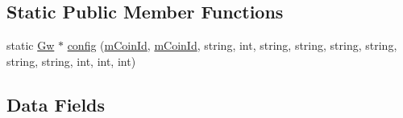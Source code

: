 \subsection*{Static Public Member Functions}
\begin{DoxyCompactItemize}
\item 
static \hyperlink{class_k_1_1_gw}{Gw} $\ast$ \hyperlink{class_k_1_1_gw_a282f7bac1cca98304b43013414a068af}{config} (\hyperlink{km_8h_a0299927fb26276a1e0f4c2b4dedb698e}{m\+Coin\+Id}, \hyperlink{km_8h_a0299927fb26276a1e0f4c2b4dedb698e}{m\+Coin\+Id}, string, int, string, string, string, string, string, string, int, int, int)
\end{DoxyCompactItemize}
\subsection*{Data Fields}
